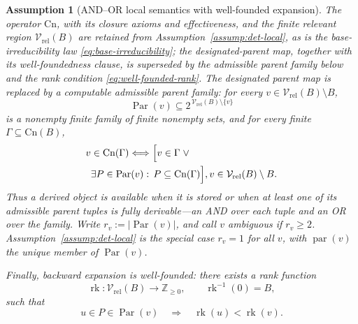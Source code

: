 \documentclass[journal]{IEEEtran}
\newcommand{\Cn}{\text{Cn}}
\newtheorem{assumption}{Assumption}[section]
\numberwithin{equation}{section}
\begin{document}
\begin{assumption}[AND--OR local semantics with well-founded expansion]
\label{assump:and-or-local}
The operator \(\Cn\), with its closure axioms and effectiveness, and the
finite relevant region \(\mathcal V_{\mathrm{rel}}(B)\) are retained from
Assumption~\ref{assump:det-local}, as is the base-irreducibility law
\eqref{eq:base-irreducibility}; the designated-parent map, together with its
well-foundedness clause, is superseded by the admissible parent family below
and the rank condition \eqref{eq:well-founded-rank}.  The designated parent
map is replaced by a computable \emph{admissible parent family}: for every
\(v\in\mathcal V_{\mathrm{rel}}(B)\setminus B\),
\[
  \operatorname{Par}(v)
  \subseteq
  2^{\,\mathcal V_{\mathrm{rel}}(B)\setminus\{v\}}
\]
is a nonempty finite family of finite nonempty sets, and for every finite
\(\Gamma\subseteq\Cn(B)\),
\begin{equation}
  \begin{split}
    v & \in\Cn(\Gamma)
    \Longleftrightarrow
    \Bigl[ v\in\Gamma \;\lor \\
       & \exists P\in\operatorname{Par}(v):\, P\subseteq\Cn(\Gamma) \Bigr],
     v\in\mathcal V_{\mathrm{rel}}(B)\setminus B.
  \end{split}
\label{eq:and-or-local-law}
\end{equation}
Thus a derived object is available when it is stored or when \emph{at least
one} of its admissible parent tuples is fully derivable---an AND over each
tuple and an OR over the family.  Write \(r_v:=|\operatorname{Par}(v)|\),
and call \(v\) \emph{ambiguous} if \(r_v\ge 2\).
Assumption~\ref{assump:det-local} is the special case \(r_v=1\) for all
\(v\), with \(\operatorname{par}(v)\) the unique member of
\(\operatorname{Par}(v)\).

Finally, backward expansion is well-founded: there exists a rank function
\[
  \operatorname{rk}:\mathcal V_{\mathrm{rel}}(B)\longrightarrow\mathbb Z_{\ge0},
  \qquad
  \operatorname{rk}^{-1}(0)=B,
\]
such that
\begin{equation}
  u\in P\in\operatorname{Par}(v)
  \quad\Longrightarrow\quad
  \operatorname{rk}(u)<\operatorname{rk}(v).
\label{eq:well-founded-rank}
\end{equation}
\end{assumption}
\end{document}
